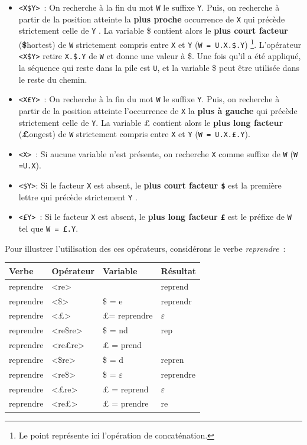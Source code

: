 \begin{itemize}
\item \verb+<X$Y>+~: On recherche à la fin du mot \verb+W+ le suffixe \verb+Y+.
	Puis, on recherche \`a partir de la position atteinte la {\bf plus proche} occurrence de \verb+X+
	qui précède strictement celle de \verb+Y+ . La variable \$ contient alors le {\bf plus court facteur}
	({\bf\$}hortest) de \verb+W+ strictement compris entre
	\verb+X+ et \verb+Y+ (\verb+W = U.X.$.Y+) \footnote{Le point représente ici l'opération de concaténation.}.
	L'opérateur \verb+<X$Y>+ retire \verb+X.$.Y+ de \verb+W+ et donne une valeur à \$. Une fois qu'il a été appliqué,
	la séquence qui reste dans la pile est \verb+U+, et la variable \$ peut être utilisée dans le reste du chemin.
\item \verb+<X£Y>+~: On recherche à la fin du mot \verb+W+ le suffixe \verb+Y+.
	Puis, on recherche \`a partir de la position atteinte l'occurrence de \verb+X+ la {\bf plus à gauche} qui
	précède strictement celle de \verb+Y+. La variable {\pounds} contient alors le {\bf plus long facteur}
	({\bf£}ongest) de \verb+W+ strictement compris entre \verb+X+ et \verb+Y+ (\verb+W = U.X.£.Y+).
\item \verb+<X>+~: Si aucune variable n'est présente, on recherche \verb+X+ comme suffixe de \verb+W+
	(\verb+W =U.X+).
\item \verb+<$Y>+: Si le facteur \verb+X+ est absent, le {\bf plus court facteur \verb+$+} est la première lettre
	qui précède strictement \verb+Y+ .
\item \verb+<£Y>+~: Si le facteur \verb+X+ est absent, le {\bf plus long facteur \verb+£+} est le préfixe de
	\verb+W+ tel que  \verb+W = £.Y+.
\end{itemize}

\noindent
Pour illustrer l'utilisation des ces opérateurs, considérons le verbe {\it reprendre}~:

\bigskip
\begin{center}
\begin{tabular}{|l|l|l|l|}
\hline
Verbe     & Opérateur & Variable & Résultat\\
\hline
\hline
reprendre & <re> & & reprend\\
reprendre & <\$> & \$ = e & reprendr\\
reprendre & <{\pounds}> &{\pounds}= reprendre & $\varepsilon$ \\
reprendre & <re\$re> & \$ = nd & rep\\
reprendre & <re{\pounds}re> & {\pounds} = prend & \\
reprendre & <\$re> & \$ = d & repren\\
reprendre & <re\$> & \$ =  $\varepsilon$ & reprendre\\
reprendre & <{\pounds}re> & {\pounds} = reprend & $\varepsilon$\\
reprendre & <re{\pounds}> & {\pounds} = prendre & re\\
\hline
\end{tabular}
\end{center}

